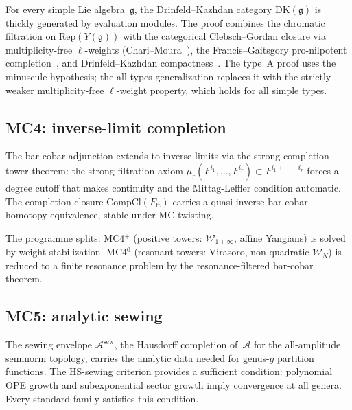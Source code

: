 \documentclass[11pt,reqno]{amsart}
\theoremstyle{definition}
\theoremstyle{remark}
\newcommand{\cA}{\mathcal{A}}
\newcommand{\cW}{\mathcal{W}}
\newcommand{\fg}{\mathfrak{g}}
\numberwithin{equation}{section}
\begin{document}
For every simple Lie algebra~$\fg$, the Drinfeld--Kazhdan
category $\mathrm{DK}(\fg)$ is thickly generated by
evaluation modules. The proof combines the chromatic
filtration on $\mathrm{Rep}(Y(\fg))$ with the categorical
Clebsch--Gordan closure via multiplicity-free
$\ell$-weights (Chari--Moura~\cite{CM08}), the Francis--Gaitsgory
pro-nilpotent completion~\cite{FG12}, and Drinfeld--Kazhdan
compactness~\cite{DK84}. The type~A proof uses the minuscule
hypothesis; the all-types generalization replaces it with
the strictly weaker multiplicity-free $\ell$-weight
property, which holds for all simple types.

\subsection{MC4: inverse-limit completion}
\label{ssec:mc4}

The bar-cobar adjunction extends to inverse limits via the
strong completion-tower theorem: the strong filtration axiom
$\mu_r(F^{i_1}, \ldots, F^{i_r})
\subset F^{i_1 + \cdots + i_r}$
forces a degree cutoff that makes continuity and the
Mittag-Leffler condition automatic. The completion closure
$\mathrm{CompCl}(F_{\mathrm{ft}})$ carries a quasi-inverse
bar-cobar homotopy equivalence, stable under MC twisting.

The programme splits: MC4$^+$ (positive towers:
$\cW_{1+\infty}$, affine Yangians) is solved by weight
stabilization. MC4$^0$ (resonant towers: Virasoro,
non-quadratic $\cW_N$) is reduced to a finite resonance
problem by the resonance-filtered bar-cobar theorem.

\subsection{MC5: analytic sewing}
\label{ssec:mc5}

The sewing envelope $\cA^{\mathrm{sew}}$, the Hausdorff
completion of~$\cA$ for the all-amplitude seminorm
topology, carries the analytic data needed for genus-$g$
partition functions. The HS-sewing criterion provides a
sufficient condition: polynomial OPE growth and
subexponential sector growth imply convergence at all
genera. Every standard family satisfies this condition.
\end{document}
